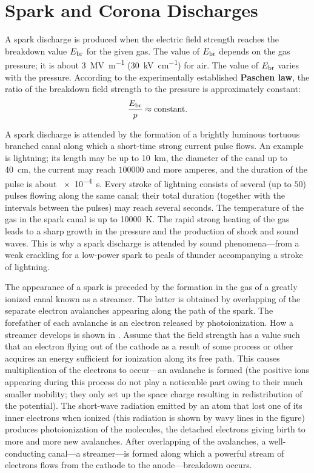 \section{Spark and Corona Discharges}\label{sec:12_8}

A spark discharge is produced when the electric field strength reaches the breakdown value $E_{\text{br}}$ for the given gas.
The value of $E_{\text{br}}$ depends on the gas pressure; it is about \SI{3}{\mega\volt\per\metre}  (\SI{30}{\kilo\volt\per\centi\metre}) for air.
The value of $E_{\text{br}}$ varies with the pressure.
According to the experimentally established \textbf{Paschen law}, the ratio of the breakdown field strength to the pressure is approximately constant:
\begin{equation*}
    \frac{E_{\text{br}}}{p} \approx \text{constant}.
\end{equation*}

A spark discharge is attended by the formation of a brightly luminous tortuous branched canal along which a short-time strong current pulse flows.
An example is lightning; its length may be up to \SI{10}{\kilo\metre}, the diameter of the canal up to \SI{40}{\centi\metre}, the current may reach $100 000$ and more amperes, and the duration of the pulse is about \SI{e-4}{\second}.
Every stroke of lightning consists of several (up to $50$) pulses flowing along the same canal; their total duration (together with the intervals between the pulses) may reach several seconds.
The temperature of the gas in the spark canal is up to \SI{10000}{\kelvin}.
The rapid strong heating of the gas leads to a sharp growth in the pressure and the production of shock and sound waves.
This is why a spark discharge is attended by sound phenomena---from a weak crackling for a low-power spark to peals of thunder accompanying a stroke of lightning.

The appearance of a spark is preceded by the formation in the gas of a greatly ionized canal known as a streamer.
The latter is obtained by overlapping of the separate electron avalanches appearing along the path of the spark.
The forefather of each avalanche is an electron released by photoionization.
How a streamer develops is shown in .
Assume that the field strength has a value such that an electron flying out of the cathode as a result of some process or other acquires an energy sufficient for ionization along its free path.
This causes multiplication of the electrons to occur---an avalanche is formed (the positive ions appearing during this process do not play a noticeable part owing to their much smaller mobility; they only set up the space charge resulting in redistribution of the potential).
The short-wave radiation emitted by an atom that lost one of its inner electrons when ionized (this radiation is shown by wavy lines in the figure) produces photoionization of the molecules, the detached electrons giving birth to more and more new avalanches.
After overlapping of the avalanches, a well-conducting canal---a streamer---is formed along which a powerful stream of electrons flows from the cathode to the anode---breakdown occurs.

